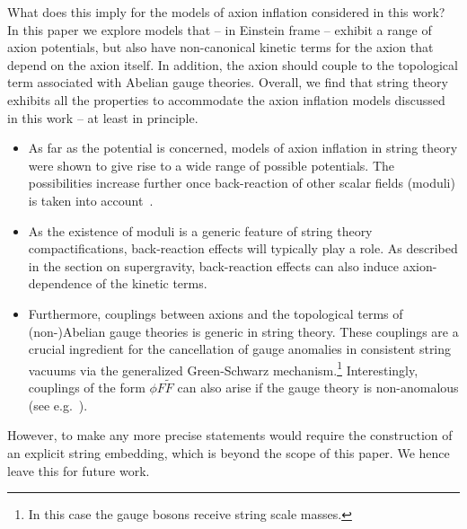What does this imply for the models of axion inflation considered in this work? In this paper we explore models that -- in Einstein frame -- exhibit a range of axion potentials, but also have non-canonical kinetic terms for the axion that depend on the axion itself. In addition, the axion should couple to the topological term associated with Abelian gauge theories. Overall, we find that string theory exhibits all the properties to accommodate the axion inflation models discussed in this work -- at least in principle. 
\begin{itemize}
\item As far as the potential is concerned, models of axion inflation in string theory were shown to give rise to a wide range of possible potentials. The possibilities increase further once back-reaction of other scalar fields (moduli) is taken into account~\cite{1011.4521,1405.3652}. 
\item As the existence of moduli is a generic feature of string theory compactifications, back-reaction effects will typically play a role. As described in the section on supergravity, back-reaction effects can also induce axion-dependence of the kinetic terms. 
\item Furthermore, couplings between axions and the topological terms of (non-)Abelian gauge theories is generic in string theory. These couplings are a crucial ingredient for the cancellation of gauge anomalies in consistent string vacuums via the generalized Green-Schwarz mechanism.\footnote{In this case the gauge bosons receive string scale masses.} Interestingly, couplings of the form $\phi F \tilde{F}$ can also arise if the gauge theory is non-anomalous (see e.g.~\cite{0906.1920}).
\end{itemize}
However, to make any more precise statements would require the construction of an explicit string embedding, which is beyond the scope of this paper. We hence leave this for future work.